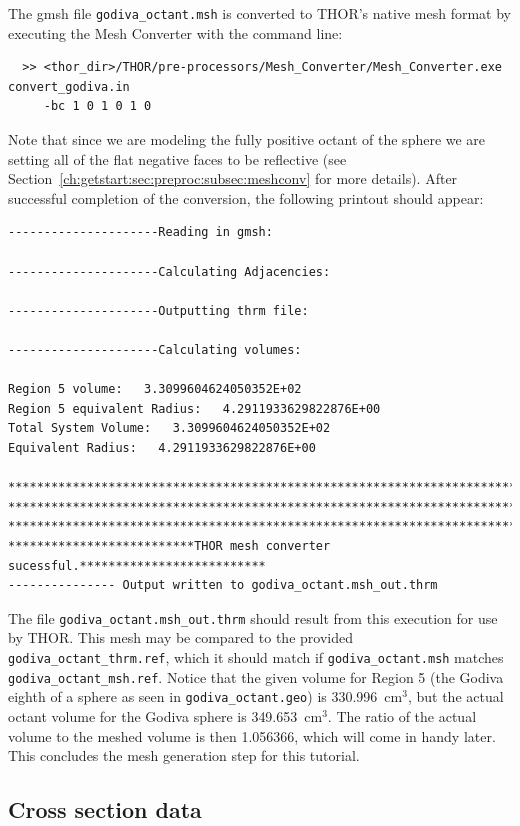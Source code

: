 The gmsh file \verb"godiva_octant.msh" is converted to THOR's native mesh format by executing the Mesh Converter with the command line:
\begin{verbatim}
  >> <thor_dir>/THOR/pre-processors/Mesh_Converter/Mesh_Converter.exe convert_godiva.in
     -bc 1 0 1 0 1 0
\end{verbatim}
Note that since we are modeling the fully positive octant of the sphere we are setting all of the flat negative faces to be reflective (see Section~\ref{ch:getstart:sec:preproc:subsec:meshconv} for more details).
After successful completion of the conversion, the following printout should appear:
\begin{verbatim}
---------------------Reading in gmsh:

---------------------Calculating Adjacencies:

---------------------Outputting thrm file:

---------------------Calculating volumes:

Region 5 volume:   3.3099604624050352E+02
Region 5 equivalent Radius:   4.2911933629822876E+00
Total System Volume:   3.3099604624050352E+02
Equivalent Radius:   4.2911933629822876E+00

**********************************************************************************
**********************************************************************************
**********************************************************************************
**************************THOR mesh converter sucessful.**************************
--------------- Output written to godiva_octant.msh_out.thrm
\end{verbatim}

The file \verb"godiva_octant.msh_out.thrm" should result from this execution for use by THOR.
This mesh may be compared to the provided \verb"godiva_octant_thrm.ref", which it should match if \verb"godiva_octant.msh" matches \verb"godiva_octant_msh.ref".
Notice that the given volume for Region 5 (the Godiva eighth of a sphere as seen in \verb"godiva_octant.geo") is 330.996~cm$^3$, but the actual octant volume for the Godiva sphere is 349.653~cm$^3$.
The ratio of the actual volume to the meshed volume is then 1.056366, which will come in handy later.
This concludes the mesh generation step for this tutorial.

\subsection{Cross section data}


